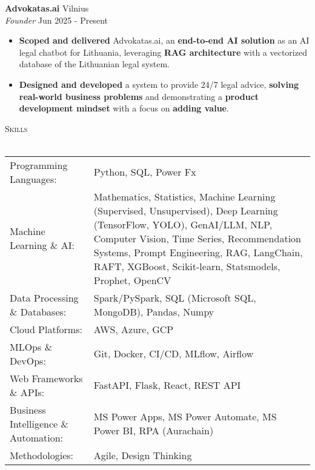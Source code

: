 \documentclass[a4paper]{article}
\newcommand{\lineunder} {
    \vspace*{-8pt} \\
    \hspace*{-18pt} \hrulefill \\
}
\newcommand{\header} [1] {
    {\hspace*{-18pt}\vspace*{6pt} \textsc{#1}}
    \vspace*{-6pt} \lineunder
}
\begin{document}
\textbf{Advokatas.ai} \hfill Vilnius\\
\textit{Founder} \hfill Jun 2025 - Present\\
\vspace{-1mm}
\begin{itemize} \itemsep 1pt
	\item \textbf{Scoped and delivered} Advokatas.ai, an \textbf{end-to-end AI solution} as an AI legal chatbot for Lithuania, leveraging \textbf{RAG architecture} with a vectorized database of the Lithuanian legal system.
	\item \textbf{Designed and developed} a system to provide 24/7 legal advice, \textbf{solving real-world business problems} and demonstrating a \textbf{product development mindset} with a focus on \textbf{adding value}.
\end{itemize}
\header{Skills}
\begin{tabular}{ l l }
	Programming Languages:    & Python, SQL, Power Fx \\
	Machine Learning \& AI:   & Mathematics, Statistics, Machine Learning (Supervised, Unsupervised), Deep Learning (TensorFlow, YOLO), GenAI/LLM, NLP, Computer Vision, Time Series, Recommendation Systems, Prompt Engineering, RAG, LangChain, RAFT, XGBoost, Scikit-learn, Statsmodels, Prophet, OpenCV \\
	Data Processing \& Databases: & Spark/PySpark, SQL (Microsoft SQL, MongoDB), Pandas, Numpy \\
	Cloud Platforms:          & AWS, Azure, GCP \\
	MLOps \& DevOps:          & Git, Docker, CI/CD, MLflow, Airflow \\
	Web Frameworks \& APIs:   & FastAPI, Flask, React, REST API \\
	Business Intelligence \& Automation: & MS Power Apps, MS Power Automate, MS Power BI, RPA (Aurachain) \\
	Methodologies:            & Agile, Design Thinking
\end{tabular}
\vspace{2mm}
\end{document}
